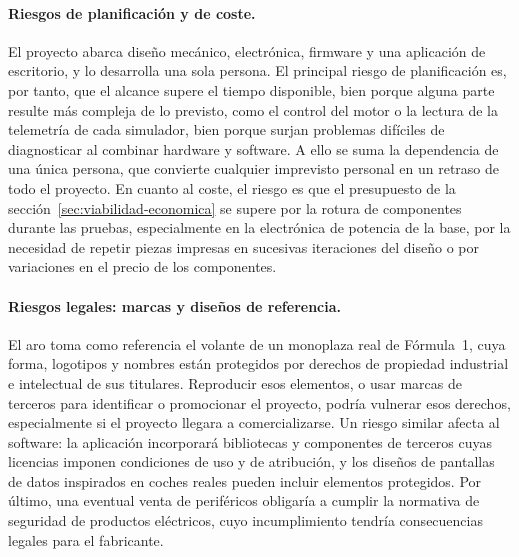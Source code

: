 \paragraph{Riesgos de planificación y de coste.}
El proyecto abarca diseño mecánico, electrónica, firmware y una aplicación de escritorio, y lo desarrolla una sola persona. El principal riesgo de planificación es, por tanto, que el alcance supere el tiempo disponible, bien porque alguna parte resulte más compleja de lo previsto, como el control del motor o la lectura de la telemetría de cada simulador, bien porque surjan problemas difíciles de diagnosticar al combinar hardware y software. A ello se suma la dependencia de una única persona, que convierte cualquier imprevisto personal en un retraso de todo el proyecto. En cuanto al coste, el riesgo es que el presupuesto de la sección~\ref{sec:viabilidad-economica} se supere por la rotura de componentes durante las pruebas, especialmente en la electrónica de potencia de la base, por la necesidad de repetir piezas impresas en sucesivas iteraciones del diseño o por variaciones en el precio de los componentes.

\paragraph{Riesgos legales: marcas y diseños de referencia.}
El aro toma como referencia el volante de un monoplaza real de Fórmula~1, cuya forma, logotipos y nombres están protegidos por derechos de propiedad industrial e intelectual de sus titulares. Reproducir esos elementos, o usar marcas de terceros para identificar o promocionar el proyecto, podría vulnerar esos derechos, especialmente si el proyecto llegara a comercializarse. Un riesgo similar afecta al software: la aplicación incorporará bibliotecas y componentes de terceros cuyas licencias imponen condiciones de uso y de atribución, y los diseños de pantallas de datos inspirados en coches reales pueden incluir elementos protegidos. Por último, una eventual venta de periféricos obligaría a cumplir la normativa de seguridad de productos eléctricos, cuyo incumplimiento tendría consecuencias legales para el fabricante.

